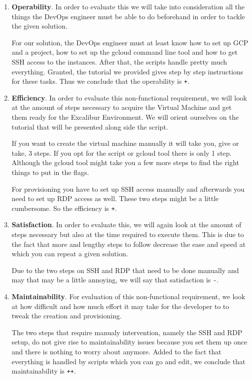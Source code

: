 \begin{enumerate}

	\item \textbf{Operability}.  In order to evaluate this we will
	take into consideration all the things the DevOps engineer must be
	able to do beforehand in order to tackle the given solution.

	For our solution, the DevOps engineer must at least know how to
	set up GCP and a project, how to set up the gcloud command line
	tool and how to get SSH access to the instances. After that, the
	scripts handle pretty much everything. Granted, the tutorial we
	provided gives step by step instructions for these tasks. Thus we
	conclude that the operability is \verb|+|.

	\item \textbf{Efficiency}.	In order to evaluate this
	non-functional requirement, we will look at the amount of steps
	necessary to acquire the Virtual Machine and get them ready for
	the Excalibur Environment. We will orient ourselves on the
	tutorial that will be presented along side the script.

	If you want to create the virtual machine manually it will take
	you, give or take, 3 steps. If you opt for the script or gcloud
	tool there is only 1 step. Although the gcloud tool might take you
	a few more steps to find the right things to put in the flags.

	For provisioning you have to set up SSH access manually and
	afterwards you need to set up RDP access as well. These two steps
	might be a little cumbersome. So the efficiency is \verb|+|.

	\item \textbf{Satisfaction}.  In order to evaluate this, we will
	again look at the amount of steps necessary but also at the time
	required to execute them.  This is due to the fact that more and
	lengthy steps to follow decrease the ease and speed at which you
	can repeat a given solution.

	Due to the two steps on SSH and RDP that need to be done manually
	and may that may be a little annoying, we will say that
	satisfaction is \verb|-|.

	\item \textbf{Maintainability}.  For evaluation of this
	non-functional requirement, we look at how difficult and how much
	effort it may take for the developer to to tweak the creation and
	provisioning.

	The two steps that require manualy intervention, namely the SSH
	and RDP setup, do not give rise to maintainability issues because
	you set them up once and there is nothing to worry about anymore.
	Added to the fact that everything is handled by scripts which you
	can go and edit, we conclude that maintainability is \verb|++|.


\end{enumerate}
